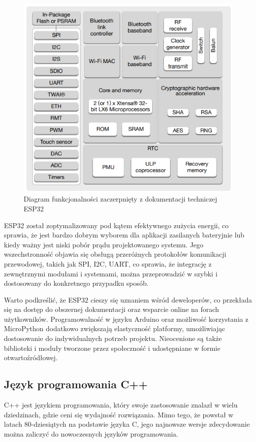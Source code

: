 \documentclass[12pt,twoside]{article}
\begin{document}
\begin{figure}[ht]
   \centering
   \includegraphics[width=12cm]{images/esp32_functional_diagram.png}
   \caption{Diagram funkcjonalności zaczerpnięty z dokumentacji techniczej ESP32\cite{esp32Datasheet}}
   \label{Fig:functionalDiagram}
\end{figure}

ESP32 został zoptymalizowany pod kątem efektywnego zużycia energii, co sprawia, że jest bardzo dobrym
wyborem dla aplikacji zasilanych bateryjnie lub kiedy ważny jest niski pobór prądu projektowanego systemu. Jego wszechstronność objawia
się obsługą przeróżnych protokołów komunikacji przewodowej,
takich jak SPI, I2C, UART, co sprawia, że integrację z zewnętrznymi modułami i systemami, można przeprowadzić w szybki i dostosowany do konkretnego przypadku sposób.

Warto podkreślić, że ESP32 cieszy się uznaniem wśród deweloperów, co przekłada się na dostęp do obszernej dokumentacji oraz wsparcie online na forach użytkowników. Programowalność w języku Arduino oraz możliwość korzystania
z MicroPython dodatkowo zwiększają elastyczność platformy, umożliwiając dostosowanie do indywidualnych potrzeb projektu.
Nieocenione są także biblioteki i moduły tworzone przez społeczność i udostępniane w formie otwartoźródłowej.
\subsection{Język programowania C++}
C++ jest językiem programowania, który swoje zastosowanie znalazł w wielu dziedzinach, gdzie ceni się wydajność rozwiązania. Mimo tego, że powstał w latach 80-dziesiątych na podstawie języka C, jego najnowsze wersje zdecydowanie można zaliczyć do nowoczesnych języków programowania.
\end{document}
